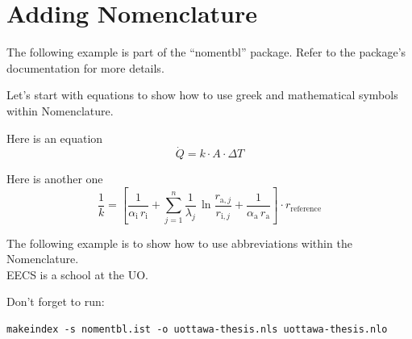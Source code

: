 \section{Adding Nomenclature}

The following example is part of the ``nomentbl'' package. Refer to the package's documentation for more details.

\bigskip

\noindent
Let's start with equations to show how to use greek and mathematical symbols within Nomenclature.

Here is an equation
%
\begin{equation}\label{eq:heatflux}
  \dot{Q} = k \cdot A \cdot \Delta T
\end{equation}%
%
%
%
%
%
%
%

Here is another one
%
\begin{equation}\label{eq:ohtc}
  \frac{1}{k} = \left[\frac{1}{\alpha _{\mathrm{i}}\,r_{\mathrm{i}}} +
    \sum^n_{j=1}\frac{1}{\lambda _j}\,
    \ln \frac{r_{\mathrm{a},j}}{r_{\mathrm{i},j}} +
    \frac{1}{\alpha _{\mathrm{a}}\,
      r_{\mathrm{a}}}\right] \cdot r_{\mathrm{reference}}
\end{equation}%
%
%
%
%
%
%
% 
%


\bigskip

\noindent
The following example is to show how to use abbreviations within the Nomenclature.\\
EECS is a school at the UO.
%
%



\bigskip

\noindent
Don't forget to run:
\begin{verbatim}
makeindex -s nomentbl.ist -o uottawa-thesis.nls uottawa-thesis.nlo
\end{verbatim}



